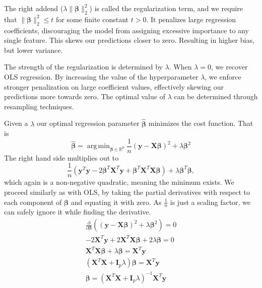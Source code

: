 \documentclass{article}
\DeclareMathOperator*{\argmin}{arg\,min}
\begin{document}
The right addend ($\lambda\lVert \boldsymbol{\beta} \rVert_2^2$) is called the regularization term, and we require that $\lVert \boldsymbol{\beta} \rVert_2^2 \leq t$ for some finite constant $t > 0$. It penalizes large regression coefficients, discouraging the model from assigning excessive importance to any single feature. This skews our predictions closer to zero. Resulting in higher bias, but lower variance.

The strength of the regularization is determined by $\lambda$. When $\lambda=0$, we recover OLS regression. By increasing the value of the hyperparameter $\lambda$, we enforce stronger penalization on large coefficient values, effectively skewing our predictions more towards zero. The optimal value of $\lambda$ can be determined through resampling techniques.

Given a $\lambda$ our optimal regression parameter $\boldsymbol{\hat{\beta}}$ minimizes the cost function. That is
\begin{equation*}
    \boldsymbol{\hat{\beta}} = \argmin_{\boldsymbol{\beta} \in \mathbb{R}^p} \frac{1}{n} \left( \boldsymbol{y} - \boldsymbol{X} \boldsymbol{\beta} \right)^2 + \lambda \boldsymbol{\beta}^2
\end{equation*}
The right hand side multiplies out to
\begin{equation*}
    \frac{1}{n} \left( \boldsymbol{y}^T \boldsymbol{y} - 2 \boldsymbol{\beta}^T \boldsymbol{X}^T \boldsymbol{y} + \boldsymbol{\beta}^T \boldsymbol{X}^T \boldsymbol{X} \boldsymbol{\beta} \right) + \lambda \boldsymbol{\beta}^T \boldsymbol{\beta},
\end{equation*}
which again is a non-negative quadratic, meaning the minimum exists. We proceed similarly as with OLS, by taking the partial derivatives with respect to each component of $\boldsymbol{\beta}$ and equating it with zero. As $\frac{1}{n}$ is just a scaling factor, we can safely ignore it while finding the derivative.
\begin{gather*}
    \frac{\partial}{\partial \boldsymbol{\beta}} \left( \left( \boldsymbol{y} - \boldsymbol{X} \boldsymbol{\beta} \right)^2 + \lambda \boldsymbol{\beta}^2 \right) = 0 \\
    -2 \boldsymbol{X}^T \boldsymbol{y} + 2 \boldsymbol{X}^T \boldsymbol{X \beta} + 2\lambda \boldsymbol{\beta} = 0 \\
    \boldsymbol{X}^T \boldsymbol{X \beta} + \lambda \boldsymbol{\beta} = \boldsymbol{X}^T \boldsymbol{y} \\
    \left(\boldsymbol{X}^T \boldsymbol{X} + \boldsymbol{I}_p \lambda \right) \boldsymbol{\beta} = \boldsymbol{X}^T \boldsymbol{y} \\
    \boldsymbol{\beta} = \left(\boldsymbol{X}^T \boldsymbol{X} + \boldsymbol{I}_p \lambda \right)^{-1} \boldsymbol{X}^T \boldsymbol{y}
\end{gather*}
\end{document}
